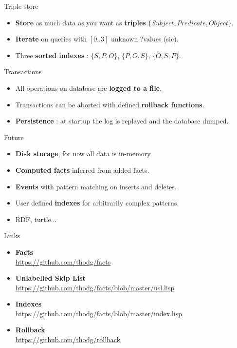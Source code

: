 \documentclass{beamer}
\begin{document}
\begin{frame}
  Triple store
  \begin{itemize}
  \item {\bf Store} as much data as you want as {\bf triples} $\{Subject, Predicate, Object\}$.
  \item {\bf Iterate} on queries with $[0..3]$ unknown ?values (sic).
  \item Three {\bf sorted indexes} : $\{S, P, O\}$, $\{P, O, S\}$, $\{O, S, P\}$.
  \end{itemize}
\end{frame}

\begin{frame}
  Transactions
  \begin{itemize}
  \item All operations on database are {\bf logged to a file}.
  \item Transactions can be aborted with defined {\bf rollback functions}.
  \item {\bf Persistence} : at startup the log is replayed and the database dumped.
  \end{itemize}
\end{frame}

\begin{frame}
  Future
  \begin{itemize}
  \item {\bf Disk storage}, for now all data is in-memory.
  \item {\bf Computed facts} inferred from added facts.
  \item {\bf Events} with pattern matching on inserts and deletes.
  \item User defined {\bf indexes} for arbitrarily complex patterns.
  \item RDF, turtle...
  \end{itemize}
\end{frame}

\begin{frame}
  Links
  \begin{itemize}
  \item {\bf Facts}\\
    \url{https://github.com/thodg/facts}
  \item {\bf Unlabelled Skip List}\\
    \url{https://github.com/thodg/facts/blob/master/usl.lisp}
  \item {\bf Indexes}\\
    \url{https://github.com/thodg/facts/blob/master/index.lisp}
  \item {\bf Rollback}\\
    \url{https://github.com/thodg/rollback}
  \end{itemize}
\end{frame}
\end{document}
